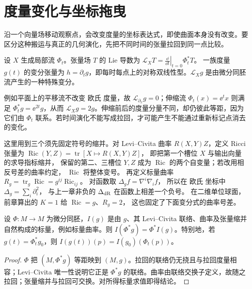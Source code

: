 \section{度量变化与坐标拖曳}

沿一个向量场移动观察点，会改变度量的坐标表达式，即使曲面本身没有改变。要区分这种搬运与真正的几何演化，先把不同时间的张量拉回到同一点比较。

\begin{definition}
设 \(X\) 生成局部流 \(\Phi_t\)。张量场 \(T\) 的 Lie 导数为
\(\mathcal L_XT=\left.\frac{\dd}{\dd t}\right|_{t=0}\Phi_t^*T\)。
一族度量 \(g(t)\) 的变分张量为 \(h=\partial_tg\)，即每时每点上的对称双线性型。\(\mathcal L_Xg\) 是由微分同胚流产生的一种特殊变分。
\end{definition}

例如平面上的平移流不改变 欧氏 度量，故 \(\mathcal L_{\partial_x}g=0\)；伸缩流 \(\Phi_t(x)=\ee^t x\) 则满足 \(\Phi_t^*g=\ee^{2t}g\)，从而 \(\mathcal L_Xg=2g\)。伸缩前后的度量分量不同，却仍彼此等距，因为它们由 \(\Phi_t\) 联系。若时间演化不能写成拉回，才可能产生不能通过重新标记点消去的变化。

这里用到三个须先固定符号的缩并。对 Levi--Civita 曲率
\(R(X,Y)Z\)，定义 Ricci 张量为
\(\operatorname{Ric}(Y,Z)=
\operatorname{tr}[X\mapsto R(X,Y)Z]\)，
即把第一个槽位 \(X\) 与输出向量的求导指标缩并，
保留的第二、三槽位 \(Y,Z\) 成为 \(\operatorname{Ric}\)
的两个自变量；若改用相反号差的曲率约定，
\(\operatorname{Ric}\) 将整体变号。
再定义标量曲率
\(R_g=\operatorname{tr}_g\operatorname{Ric}
=g^{ij}\operatorname{Ric}_{ij}\)。
对函数取 \(\Delta_g f=\nabla^i\nabla_i f\)，
所以在 欧氏 坐标中 \(\Delta_g=\sum_i\partial_i^2\)，
与上一章非负的 \(\Delta_{\rm dR}\) 在函数上相差一个负号。
在二维单位球面，前章算出的 \(K=1\) 给
\(\operatorname{Ric}=g\)、\(R_g=2\)，
这也固定了下面变分式的曲率号差。

\begin{proposition}[自然标量随拉回而变]
设 \(\Phi:M\to M\) 为微分同胚，\(I(g)\) 是由 \(g\)、其 Levi--Civita 联络、曲率及张量缩并自然构成的标量，例如标量曲率。则 \(I(\Phi^*g)=\Phi^*I(g)\)。特别地，若 \(g(t)=\Phi_t^*g_0\)，则 \(I(g(t))(p)=I(g_0)(\Phi_t(p))\)。
\end{proposition}
\begin{proof}
\(\Phi\) 把 \((M,\Phi^*g)\) 等距映到 \((M,g)\)。拉回的联络仍无挠且与拉回度量相容；Levi--Civita 唯一性说明它正是 \(\Phi^*g\) 的联络。曲率由联络交换子定义，故随之拉回；张量缩并与拉回可交换。对所得标量求值即得结论。
\end{proof}

